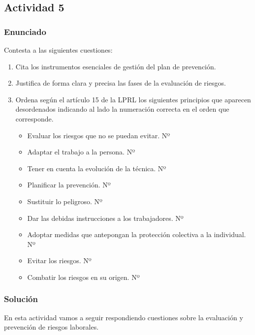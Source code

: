 \subsection{Actividad 5}
\subsubsection{Enunciado}
Contesta a las siguientes cuestiones:

\begin{enumerate}[label=\alph*.]
    \item Cita los instrumentos esenciales de gestión del plan de prevención.
    \item Justifica de forma clara y precisa las fases de la evaluación de riesgos.
    \item Ordena según el artículo 15 de la LPRL los siguientes principios que aparecen desordenados indicando al lado la numeración correcta en el orden que corresponde.
    \begin{itemize}
        \item Evaluar los riesgos que no se puedan evitar.  Nº
        \item Adaptar el trabajo a la persona. Nº
        \item Tener en cuenta la evolución de la técnica. Nº
        \item Planificar la prevención. Nº
        \item Sustituir lo peligroso. Nº
        \item Dar las debidas instrucciones a los trabajadores. Nº
        \item Adoptar medidas que antepongan la protección colectiva a la individual. Nº
        \item Evitar los riesgos. Nº
        \item Combatir los riesgos en su origen. Nº
    \end{itemize}
\end{enumerate}

\subsubsection{Solución}
En esta actividad vamos a seguir respondiendo cuestiones sobre la evaluación y prevención de riesgos laborales.


